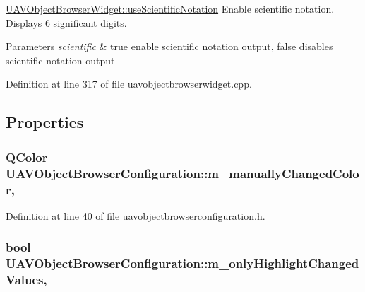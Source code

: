 \hyperlink{group___u_a_v_object_browser_plugin_gaf9528641294317e651ef6e23f6e11946}{U\-A\-V\-Object\-Browser\-Widget\-::use\-Scientific\-Notation} Enable scientific notation. Displays 6 significant digits. 


\begin{DoxyParams}{Parameters}
{\em scientific} & true enable scientific notation output, false disables scientific notation output \\
\hline
\end{DoxyParams}


Definition at line 317 of file uavobjectbrowserwidget.\-cpp.



\subsection{Properties}
\hypertarget{group___u_a_v_object_browser_plugin_gaa3a9a8f01c4d49765d9134150e110f42}{
\subsubsection[{m\-\_\-manually\-Changed\-Color}]{\setlength{\rightskip}{0pt plus 5cm}Q\-Color U\-A\-V\-Object\-Browser\-Configuration\-::m\-\_\-manually\-Changed\-Color\hspace{0.3cm}{\ttfamily [read]}, {\ttfamily [write]}}}\label{group___u_a_v_object_browser_plugin_gaa3a9a8f01c4d49765d9134150e110f42}


Definition at line 40 of file uavobjectbrowserconfiguration.\-h.

\hypertarget{group___u_a_v_object_browser_plugin_ga71cd3f90f89aecf1db0e52927661c9f4}{
\subsubsection[{m\-\_\-only\-Highlight\-Changed\-Values}]{\setlength{\rightskip}{0pt plus 5cm}bool U\-A\-V\-Object\-Browser\-Configuration\-::m\-\_\-only\-Highlight\-Changed\-Values\hspace{0.3cm}{\ttfamily [read]}, {\ttfamily [write]}}}\label{group___u_a_v_object_browser_plugin_ga71cd3f90f89aecf1db0e52927661c9f4}


